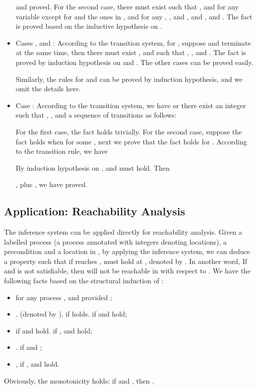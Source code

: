 \documentclass{llncs}
\begin{document}
\begin{itemize}
    and 
     proved.
    For the second case, there must exist  such that ,
    and for any variable  except for  and the ones in , 
    and for any , , and
    , and , and
    . The fact is proved based on the inductive hypothesis on .

    \item Cases ,  and : According to the transition
    system, for , suppose  and  terminate at the same time, then
    there must exist ,  and  such that
    , ,
     and .
    The fact is proved by induction hypothesis on  and .  The other cases can be proved
    easily.

    Similarly, the rules for  and  can be proved by induction hypothesis, and we omit
    the details here.

    \item Case : According to the transition system,
  we have 
  or there exist an integer  such that
    , , and a sequence of
    transitions as follows:
    
    For the first case, the fact holds trivially. For the second case,
    suppose the fact holds when  for some , next we prove  that
    the fact holds for . According to the transition rule,
    we have
    
    By induction hypothesis on ,
     and 
     must hold. Then
    
    , plus ,
    we have  proved.
  \end{itemize}




\subsection{Application: Reachability Analysis}
\label{subsection:reachability}
The inference system can be applied directly for reachability analysis.
Given a labelled process  (a process annotated with integers denoting locations), a precondition  and a location  in , by applying the inference system,
we can deduce a property   such that if  reaches ,  must hold at , denoted by
. In another word, If   and  is not satisfiable, then 
will not be reachable in   with respect to .
We have the following facts based on the structural induction of :
\begin{itemize}
  \item for any process ,  and  provided ;
  \item .
   (denoted by ), if   holds.   if  and   hold;
 \item  if  and  hold.
  if ,   and  hold;
     \item   .  if  and ;
  \item , if ,  and  hold.
\end{itemize}
Obviously, the monotonicity  holds: if  and , then .
\end{document}
